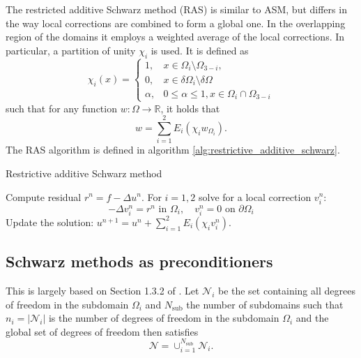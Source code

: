 The restricted additive Schwarz method (RAS) is similar to ASM, but differs in the way local corrections are combined to form a global one. In the overlapping region of the domains it employs a weighted average of the local corrections. In particular, a partition of unity $\chi_i$ is used. It is defined as
\[
  \chi_i(x)=
  \begin{cases}
    1,      & x \in \Omega_i \setminus \Omega_{3-i},                 \\
    0,      & x \in \delta \Omega_i \setminus \delta \Omega          \\
    \alpha, & 0 \leq \alpha \leq 1, x \in \Omega_i \cap \Omega_{3-i}
  \end{cases}
\]
such that for any function $w: \Omega \rightarrow \mathbb{R}$, it holds that
\[
  w = \sum_{i=1}^{2}E_i(\chi_i w_{\Omega_i}).
\]
The RAS algorithm is defined in algorithm \ref{alg:restrictive_additive_schwarz}.
\begin{algorithm}[H]
  \caption{Restrictive additive Schwarz method \cite[Algorithm 1.1]{schwarz_methods_Dolean_2015}}
  \label{alg:restrictive_additive_schwarz}
  \begin{algorithmic}
    \State Compute residual $r^n=f-\Delta u^n$.
    \State For $i=1,2$ solve for a local correction $v_i^n$:
    \[
      -\Delta v_i^n=r^n \text{ in } \Omega_i, \quad v_i^n=0 \text{ on } \partial \Omega_i
    \]
    \State Update the solution: $u^{n+1}=u^n + \sum_{i=1}^{2}E_i(\chi_i v_i^n)$.
  \end{algorithmic}
\end{algorithm}

\subsection{Schwarz methods as preconditioners}\label{sec:schwarz_preconditioners}
This is largely based on Section 1.3.2 of \cite{schwarz_methods_Dolean_2015}. Let  $\mathcal{N}_i$ be the set containing all degrees of freedom in the subdomain $\Omega_i$ and $N_{\text{sub}}$ the number of subdomains such that $n_i = |\mathcal{N}_i|$ is the number of degrees of freedom in the subdomain $\Omega_i$ and the global set of degrees of freedom then satisfies
\[
  \mathcal{N}=\cup_{i=1}^{N_{\text{sub}}} \mathcal{N}_i.
\]

